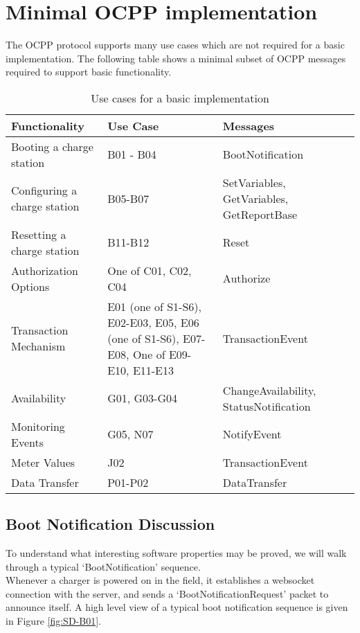 \documentclass[12pt,openany,a4paper]{book}
\begin{document}
\section{Minimal OCPP implementation}
The OCPP protocol supports many use cases which are not required for a basic implementation. The following table \cite{ocpp} shows a minimal subset of OCPP messages required to support basic functionality.\\
\begin{center}
\begin{table}[htp]
\caption{Use cases for a basic implementation}
\begin{tabular}{ |p{5cm}|p{3cm}|p{4cm}|p{2cm}|}
 \hline
Functionality & 
Use Case & 
Messages
\\
 \hline
Booting a charge station& B01 - B04& BootNotification \\
 \hline
Configuring a charge station & B05-B07 & SetVariables, GetVariables, GetReportBase \\
 \hline
Resetting a charge station& B11-B12 & Reset \\
 \hline
Authorization Options& One of C01, C02, C04 & Authorize\\
 \hline
Transaction Mechanism & E01 (one of S1-S6), E02-E03,
E05, E06 (one of S1-S6), E07-
E08, One of E09-E10, E11-E13 & TransactionEvent \\
 \hline
Availability& G01, G03-G04& ChangeAvailability, StatusNotification\\
 \hline
Monitoring Events& G05, N07 & NotifyEvent\\
 \hline
Meter Values & J02 & TransactionEvent\\
 \hline
Data Transfer& P01-P02 & DataTransfer\\
 \hline
\end{tabular}
\end{table}
\end{center}

\subsection{Boot Notification Discussion}
To understand what interesting software properties may be proved, we will walk through a typical `BootNotification' sequence.\\

Whenever a charger is powered on in the field, it establishes a websocket connection with the server, and sends a `BootNotificationRequest' packet to announce itself. A high level view of a typical boot notification sequence is given in Figure \ref{fig:SD-B01}.
\end{document}
